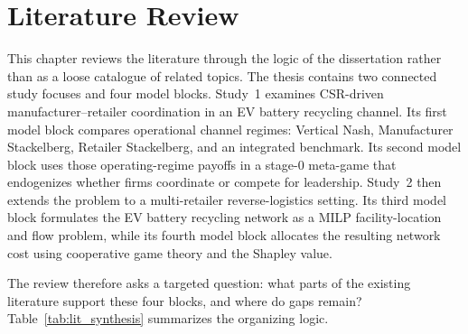 \chapter{Literature Review}
\label{chap:literature_review}

This chapter reviews the literature through the logic of the dissertation rather than as a loose catalogue of related topics. The thesis contains two connected study focuses and four model blocks. Study~1 examines CSR-driven manufacturer--retailer coordination in an EV battery recycling channel. Its first model block compares operational channel regimes: Vertical Nash, Manufacturer Stackelberg, Retailer Stackelberg, and an integrated benchmark. Its second model block uses those operating-regime payoffs in a stage-0 meta-game that endogenizes whether firms coordinate or compete for leadership. Study~2 then extends the problem to a multi-retailer reverse-logistics setting. Its third model block formulates the EV battery recycling network as a MILP facility-location and flow problem, while its fourth model block allocates the resulting network cost using cooperative game theory and the Shapley value.

The review therefore asks a targeted question: what parts of the existing literature support these four blocks, and where do gaps remain? Table~\ref{tab:lit_synthesis} summarizes the organizing logic.


